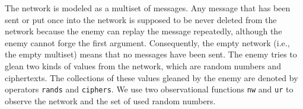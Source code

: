 \documentclass[a4paper,fleqn]{cas-dc}
\begin{document}
The network is modeled as a multiset of messages. Any message that has been sent or put once into the network is supposed to be never deleted from the network because the enemy can replay the message repeatedly, although the enemy cannot forge the first argument. Consequently, the empty network (i.e., the empty multiset) means that no messages have been sent. The enemy tries to glean two kinds of values from the network, which are random numbers and ciphertexts. The collections of these values gleaned by the enemy are denoted by operators \verb!rands! and \verb!ciphers!.
We use two observational functions \verb!nw! and \verb!ur! to observe the network and the set of used random numbers.
\end{document}
